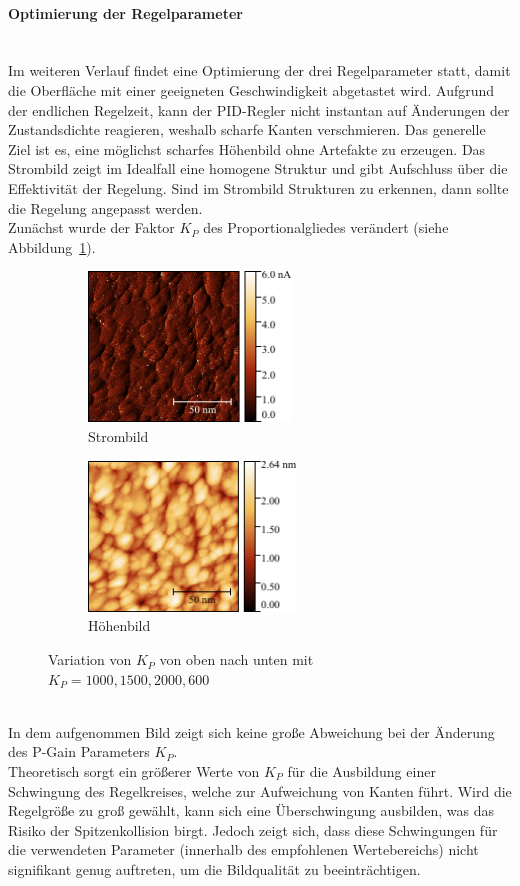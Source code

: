 \documentclass[a4paper,twoside,final]{article}
\begin{document}
\paragraph{Optimierung der Regelparameter}$~$\\
Im weiteren Verlauf findet eine Optimierung der drei Regelparameter statt, damit die Oberfläche mit einer geeigneten Geschwindigkeit abgetastet wird. Aufgrund der endlichen Regelzeit, kann der PID-Regler nicht instantan auf Änderungen der Zustandsdichte reagieren, weshalb scharfe Kanten verschmieren. Das generelle Ziel ist es, eine möglichst scharfes Höhenbild ohne Artefakte zu erzeugen. Das Strombild zeigt im Idealfall eine homogene Struktur und gibt Aufschluss über die Effektivität der Regelung. Sind im Strombild Strukturen zu erkennen, dann sollte die Regelung angepasst werden.\\
Zunächst wurde der Faktor $K_P$ des Proportionalgliedes verändert (siehe Abbildung~\ref{fig:PGlied}).
\begin{figure}[htp]
    \centering
    \begin{subfigure}{0.45\textwidth}
        \includegraphics[height=4cm]{Bilder/Image01979_PGain_Strom.pdf}
        \caption{Strombild}
    \end{subfigure}
    \hspace{0.5cm}
    \begin{subfigure}{0.45\textwidth}
        \includegraphics[height=4cm]{Bilder/Image01979_PGain.pdf}
        \caption{Höhenbild}
    \end{subfigure}
    \caption{Variation von $K_P$ von oben nach unten mit $K_P = 1000, 1500, 2000, 600$}
    \label{fig:PGlied}
\end{figure}\\
In dem aufgenommen Bild zeigt sich keine große Abweichung bei der Änderung des P-Gain Parameters $K_P$.\\
Theoretisch sorgt ein größerer Werte von $K_P$ für die Ausbildung einer Schwingung des Regelkreises, welche zur Aufweichung von Kanten führt. Wird die Regelgröße zu groß gewählt, kann sich eine Überschwingung ausbilden, was das Risiko der Spitzenkollision birgt. Jedoch zeigt sich, dass diese Schwingungen für die verwendeten Parameter (innerhalb des empfohlenen Wertebereichs) nicht signifikant genug auftreten, um die Bildqualität zu beeinträchtigen.\\
\end{document}
